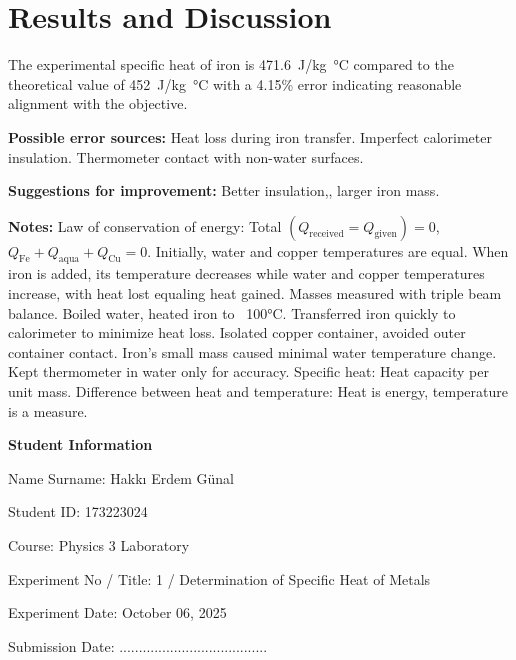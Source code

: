\documentclass[12pt, a4paper]{article}
\begin{document}
\section{Results and Discussion}
The experimental specific heat of iron is \SI{471.6}{J/kg\celsius} compared to the theoretical value of \SI{452}{J/kg\celsius} with a 4.15\% error indicating reasonable alignment with the objective.

\textbf{Possible error sources:}  
Heat loss during iron transfer.  
Imperfect calorimeter insulation.  
Thermometer contact with non-water surfaces.

\textbf{Suggestions for improvement:} Better insulation,, larger iron mass.

\textbf{Notes:}  
Law of conservation of energy: Total $(Q_{\text{received}} = Q_{\text{given}}) = 0$, $Q_{\text{Fe}} + Q_{\text{aqua}} + Q_{\text{Cu}} = 0$.  
Initially, water and copper temperatures are equal.  
When iron is added, its temperature decreases while water and copper temperatures increase, with heat lost equaling heat gained.  
Masses measured with triple beam balance.  
Boiled water, heated iron to ~100°C.  
Transferred iron quickly to calorimeter to minimize heat loss.  
Isolated copper container, avoided outer container contact.  
Iron's small mass caused minimal water temperature change.  
Kept thermometer in water only for accuracy.  
Specific heat: Heat capacity per unit mass.  
Difference between heat and temperature: Heat is energy, temperature is a measure.

\newpage

\textbf{Student Information}

Name Surname: Hakkı Erdem Günal

Student ID: 173223024

Course: Physics 3 Laboratory

Experiment No / Title: 1 / Determination of Specific Heat of Metals

Experiment Date: October 06, 2025

Submission Date: ......................................
\end{document}
